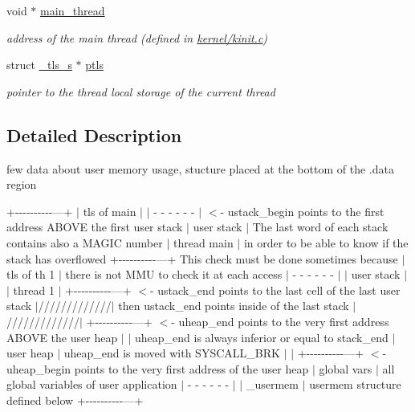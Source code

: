 \begin{DoxyCompactItemize}
void $\ast$ \hyperlink{struct__usermem__s_a72dc8dd0f2611deaef667aa2f9dbeb9f}{main\-\_\-thread}
\begin{DoxyCompactList}\small\item\em address of the main thread (defined in \hyperlink{kinit_8c}{kernel/kinit.\-c}) \end{DoxyCompactList}\item 
struct \hyperlink{struct__tls__s}{\-\_\-tls\-\_\-s} $\ast$ \hyperlink{struct__usermem__s_a092a5f4499ea31a3da83e6716d959626}{ptls}
\begin{DoxyCompactList}\small\item\em pointer to the thread local storage of the current thread \end{DoxyCompactList}\end{DoxyCompactItemize}


\subsection{Detailed Description}
few data about user memory usage, stucture placed at the bottom of the .data region 

+-\/-\/-\/-\/-\/-\/-\/-\/-\/-\/---+ $|$ tls of main $|$ $|$ -\/ -\/ -\/ -\/ -\/ -\/ $|$ $<$-\/ ustack\-\_\-begin points to the first address A\-B\-O\-V\-E the first user stack $|$ user stack $|$ The last word of each stack contains also a M\-A\-G\-I\-C number $|$ thread main $|$ in order to be able to know if the stack has overflowed +-\/-\/-\/-\/-\/-\/-\/-\/-\/-\/---+ This check must be done sometimes because $|$ tls of th 1 $|$ there is not M\-M\-U to check it at each access $|$ -\/ -\/ -\/ -\/ -\/ -\/ $|$ $|$ user stack $|$ $|$ thread 1 $|$ +-\/-\/-\/-\/-\/-\/-\/-\/-\/-\/---+ $<$-\/ ustack\-\_\-end points to the last cell of the last user stack $|$/////////////$|$ then ustack\-\_\-end points inside of the last stack $|$/////////////$|$ +-\/-\/-\/-\/-\/-\/-\/-\/-\/-\/---+ $<$-\/ uheap\-\_\-end points to the very first address A\-B\-O\-V\-E the user heap $|$ $|$ uheap\-\_\-end is always inferior or equal to stack\-\_\-end $|$ user heap $|$ uheap\-\_\-end is moved with S\-Y\-S\-C\-A\-L\-L\-\_\-\-B\-R\-K $|$ $|$ +-\/-\/-\/-\/-\/-\/-\/-\/-\/-\/---+ $<$-\/ uheap\-\_\-begin points to the very first address of the user heap $|$ global vars $|$ all global variables of user application $|$ -\/ -\/ -\/ -\/ -\/ -\/ $|$ $|$ \-\_\-usermem $|$ usermem structure defined below +-\/-\/-\/-\/-\/-\/-\/-\/-\/-\/---+ 

